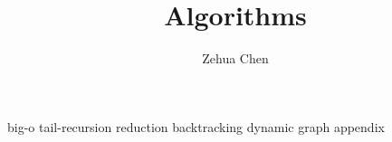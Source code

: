 \documentclass[letterpaper, 11pt]{report}
\title{Algorithms}
\author{Zehua Chen}
\begin{document}
  \maketitle
  \tableofcontents

  {big-o}
  {tail-recursion}
  {reduction}
  {backtracking}
  {dynamic}
  {graph}
  {appendix}
\end{document}
